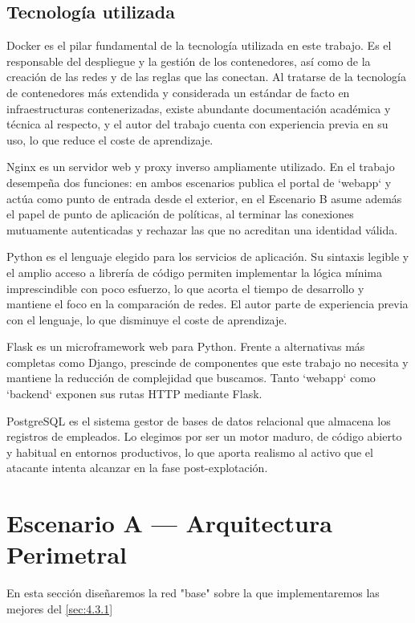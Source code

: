\documentclass[11pt,spanish,listoffigures,listoftables]{tfgetsinf}
\begin{document}
        \subsection{Tecnología utilizada}
        Docker es el pilar fundamental de la tecnología utilizada en este trabajo. Es el responsable del despliegue y la gestión de los contenedores, así como de la creación de las redes y de las reglas que las conectan. Al tratarse de la tecnología de contenedores más extendida y considerada un estándar de facto en infraestructuras contenerizadas, existe abundante documentación académica y técnica al respecto, y el autor del trabajo cuenta con experiencia previa en su uso, lo que reduce el coste de aprendizaje.

        Nginx es un servidor web y proxy inverso ampliamente utilizado. En el trabajo desempeña dos funciones: en ambos escenarios publica el portal de `webapp` y actúa como punto de entrada desde el exterior, en el Escenario B asume además el papel de punto de aplicación de políticas, al terminar las conexiones mutuamente autenticadas y rechazar las que no acreditan una identidad válida.

        Python es el lenguaje elegido para los servicios de aplicación. Su sintaxis legible y el amplio acceso a librería de código permiten implementar la lógica mínima imprescindible con poco esfuerzo, lo que acorta el tiempo de desarrollo y mantiene el foco en la comparación de redes. El autor parte de experiencia previa con el lenguaje, lo que disminuye el coste de aprendizaje.

        Flask es un microframework web para Python. Frente a alternativas más completas como Django, prescinde de componentes que este trabajo no necesita y mantiene la reducción de complejidad que buscamos. Tanto `webapp` como `backend` exponen sus rutas HTTP mediante Flask.

        PostgreSQL es el sistema gestor de bases de datos relacional que almacena los registros de empleados. Lo elegimos por ser un motor maduro, de código abierto y habitual en entornos productivos, lo que aporta realismo al activo que el atacante intenta alcanzar en la fase post-explotación.

        
    \section{Escenario A — Arquitectura Perimetral}
    En esta sección diseñaremos la red "base" sobre la que implementaremos las mejores del \cref{sec:4.3.1}
        
\end{document}

